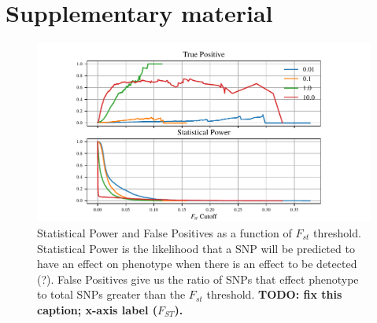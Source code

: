 \documentclass{article}
\begin{document}

{}

\clearpage
\appendix
\setcounter{table}{0}
\renewcommand{\thetable}{S\arabic{table}}
\setcounter{figure}{0}
\renewcommand{\thefigure}{S\arabic{figure}}


\section*{Supplementary material}

\begin{figure}
	\begin{center}
  		\includegraphics{Final_Plots/True_Power_0_25_500.pdf}
  		\caption{ 
		Statistical Power and False Positives as a function of $F_{st}$ threshold. 
		Statistical Power is the likelihood that a SNP will be predicted to have an effect on phenotype when there is an effect to be detected (?).
		False Positives give us the ratio of SNPs that effect phenotype to total SNPs greater than the $F_{st}$ threshold.
            \textbf{
                TODO: fix this caption; x-axis label ($F_{ST}$).}
		}
  		\label{fig:Power_FP}
	\end{center}
\end{figure}
\end{document}

